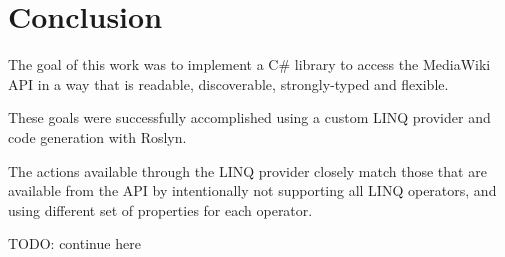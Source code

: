 \chapter*{Conclusion}

The goal of this work was to implement a C\# library to access the MediaWiki API
in a way that is readable, discoverable, strongly-typed and flexible.

These goals were successfully accomplished using a custom LINQ provider and code generation with Roslyn.

The actions available through the LINQ provider closely match those that are available from the API
by intentionally not supporting all LINQ operators, and using different set of properties for each operator.

TODO: continue here